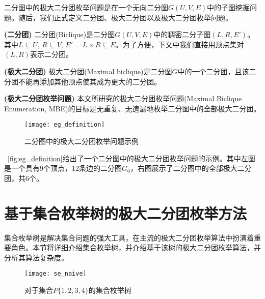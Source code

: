   二分图中的极大二分团枚举问题是在一个无向二分图$G(U,V,E)$中的子图挖掘问题。随后，我们正式定义二分团、极大二分团以及极大二分团枚举问题。

\begin{definition}
  \textup{\textbf{(二分团)}} 二分团(Biclique)是二分图$G(U,V,E)$中的稠密二分子图$(L,R,E')$。其中$L\subseteq U$, $R\subseteq V$, $E' = L \times R \subseteq E$。为了方便，下文中我们直接用顶点集对$(L,R)$表示二分团。
\end{definition}

\begin{definition}
  \textup{\textbf{(极大二分团)}} 极大二分团(Maximal biclique)是二分图$G$中的一个二分团，且该二分团不能再添加其他顶点使其成为更大的二分团。
  \label{def:mb}
\end{definition}

\begin{definition}
  \textup{\textbf{(极大二分团枚举问题)}} 本文所研究的极大二分团枚举问题(Maximal Biclique Enumeration, MBE)的目标是无重复、无遗漏地枚举二分图中的全部极大二分团。
\end{definition}

\begin{figure} [ht]
  \vspace{0.2 in}
  \centering
  \texttt{[image: eg\_definition]}
  \vspace{0.1 in}
  \caption{二分图中的极大二分团枚举问题示例}
  \label{fig:eg_definition}
\end{figure}

\begin{example}
  ~\autoref{fig:eg_definition}给出了一个二分图中的极大二分团枚举问题的示例。其中左图是一个具有9个顶点，12条边的二分图$G_0$，右图展示了二分图中的全部极大二分团，共6个。
  
\end{example}

\section{基于集合枚举树的极大二分团枚举方法}

集合枚举树是解决集合问题的强大工具，在主流的极大二分团枚举算法中扮演着重要角色。本节将详细介绍集合枚举树，并介绍基于该树的极大二分团枚举算法，并分析其算法复杂度。


\begin{figure} [ht]
  \vspace{0.1 in}
  \centering
  \texttt{[image: se\_naive]}
  \vspace{0.05 in}
  \caption{对于集合$P\{1,2,3,4\}$的集合枚举树}
  \label{fig:se_naive}
\end{figure}



